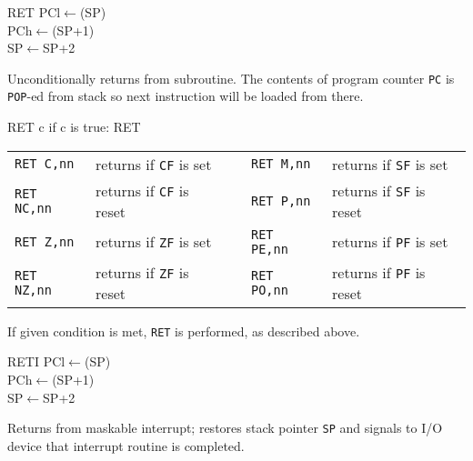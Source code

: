 \documentclass[12pt,twoside,openright,a4paper]{book}
\begin{document}
\begin{basedescript}{
	\desclabelstyle{\multilinelabel}
	\desclabelwidth{3cm}}
	\pagebreak
	\begin{detailitem}{RET}
		{PCl$\leftarrow$(SP)\\
		PCh$\leftarrow$(SP+1)\\
		SP$\leftarrow$SP+2}

		Unconditionally returns from subroutine. The contents of program counter {\tt PC} is {\tt POP}-ed from stack so next instruction will be loaded from there.

		\DetailNoEffect
				
		\begin{DetailTiming}
		\end{DetailTiming}

	\end{detailitem}

	\begin{detailitem}{RET c}
		{if c is true: RET}

		\vspace{1ex} %
		\begin{tabular}{@{}llcll}
			{\tt RET C,nn} & returns if {\tt CF} is set & & 
				{\tt RET M,nn} & returns if {\tt SF} is set\\
			{\tt RET NC,nn} & returns if {\tt CF} is reset & & 
				{\tt RET P,nn} & returns if {\tt SF} is reset\\
			{\tt RET Z,nn} & returns if {\tt ZF} is set & & 
				{\tt RET PE,nn} & returns if {\tt PF} is set\\
			{\tt RET NZ,nn} & returns if {\tt ZF} is reset & & 
				{\tt RET PO,nn} & returns if {\tt PF} is reset\\
		\end{tabular}

		If given condition is met, {\tt RET} is performed, as described above.

		\DetailNoEffect
						
		\begin{DetailTiming}
			\DetailTime{c false}{1}{5}
			\DetailTime{c true}{3}{11}
		\end{DetailTiming}

	\end{detailitem}

	\begin{detailitem}{RETI}
		{PCl$\leftarrow$(SP)\\
		PCh$\leftarrow$(SP+1)\\
		SP$\leftarrow$SP+2}

		Returns from maskable interrupt; restores stack pointer {\tt SP} and signals to I/O device that interrupt routine is completed.
		

\end{detailitem}
\end{basedescript}
\end{document}

